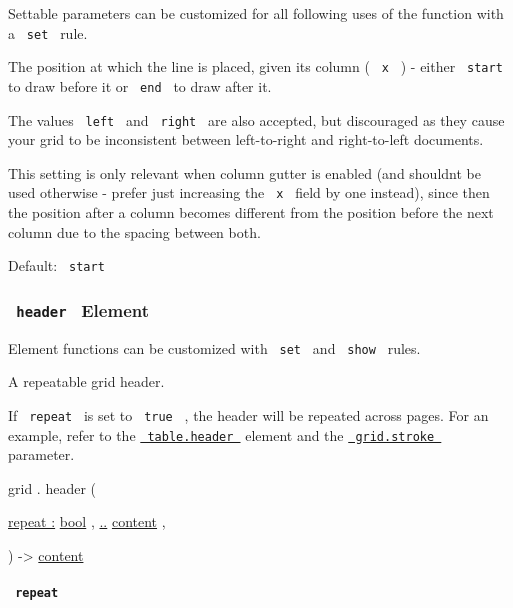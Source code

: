 \label{definitions-vline-position-settable-tooltip}
Settable parameters can be customized for all following uses of the
function with a \texttt{\ set\ } rule.

The position at which the line is placed, given its column (
\texttt{\ x\ } ) - either \texttt{\ start\ } to draw before it or
\texttt{\ end\ } to draw after it.

The values \texttt{\ left\ } and \texttt{\ right\ } are also accepted,
but discouraged as they cause your grid to be inconsistent between
left-to-right and right-to-left documents.

This setting is only relevant when column gutter is enabled (and
shouldn\textquotesingle t be used otherwise - prefer just increasing the
\texttt{\ x\ } field by one instead), since then the position after a
column becomes different from the position before the next column due to
the spacing between both.

Default: \texttt{\ start\ }

\subsubsection{\texorpdfstring{\texttt{\ header\ } {{ Element
}}}{ header   Element }}\label{definitions-header}

\label{definitions-header-element-tooltip}
Element functions can be customized with \texttt{\ set\ } and
\texttt{\ show\ } rules.

A repeatable grid header.

If \texttt{\ repeat\ } is set to \texttt{\ true\ } , the header will be
repeated across pages. For an example, refer to the
\href{/docs/reference/model/table/\#definitions-header}{\texttt{\ table.header\ }}
element and the
\href{/docs/reference/layout/grid/\#parameters-stroke}{\texttt{\ grid.stroke\ }}
parameter.

grid { . } { header } (

{ \hyperref[definitions-header-parameters-repeat]{repeat :}
\href{/docs/reference/foundations/bool/}{bool} , } {
\hyperref[definitions-header-parameters-children]{..}
\href{/docs/reference/foundations/content/}{content} , }

) -\textgreater{} \href{/docs/reference/foundations/content/}{content}

\paragraph{\texorpdfstring{\texttt{\ repeat\ }}{ repeat }}\label{definitions-header-repeat}

